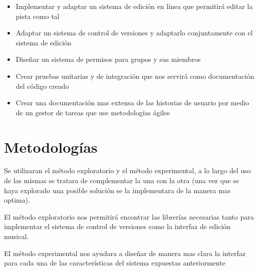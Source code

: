 \begin{itemize}
  \item Implementar y adaptar un sistema de edición en línea que permitirá editar la pista como tal
  \item Adaptar un sistema de control de versiones y adaptarlo conjuntamente con el sistema de edición
  \item Diseñar un sistema de permisos para grupos y sus miembros
  \item Crear pruebas unitarias y de integración que nos servirá como documentación del código creado
  \item Crear una documentación mas extensa de las historias de usuario por medio de un gestor de tareas que use metodologías ágiles
\end{itemize}

\section{Metodologías}

Se utilizaran el método exploratorio y el método experimental, a lo largo del
uso de las mismas se tratara de complementar la una con la otra (una vez que se
haya explorado una posible solución se la implementara de la manera mas
optima).

El método exploratorio nos permitirá encontrar las librerías necesarias tanto
para implementar el sistema de control de versiones como la interfaz de edición
musical.

El método experimental nos ayudara a diseñar de manera mas clara la interfaz
para cada una de las características del sistema expuestas anteriormente

